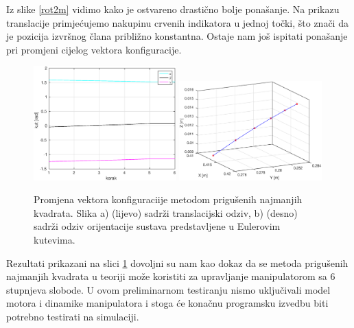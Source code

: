 \documentclass[times, utf8, diplomski, numeric]{fer}
\begin{document}
Iz slike \ref{rot2m} vidimo kako je ostvareno drastično bolje ponašanje.
Na prikazu translacije primjećujemo nakupinu crvenih indikatora u jednoj točki, što znači da je pozicija izvršnog člana približno konstantna.
Ostaje nam još ispitati ponašanje pri promjeni cijelog vektora konfiguracije.
\begin{figure}[h!]
\centering
\includegraphics[width = 0.49\textwidth]{matlab_pravocrtno2}
\includegraphics[width = 0.49\textwidth]{matlab_pravocrtno2_kut}
\caption{Promjena vektora konfiguraciije metodom prigušenih najmanjih kvadrata.
Slika a) (lijevo) sadrži translacijski odziv, b) (desno) sadrži odziv orijentacije sustava predstavljene u Eulerovim kutevima.} \label{PPI}
\end{figure}

Rezultati prikazani na slici \ref{PPI} dovoljni su nam kao dokaz da se metoda prigušenih najmanjih kvadrata u teoriji može koristiti za upravljanje manipulatorom sa 6 stupnjeva slobode.
U ovom preliminarnom testiranju nismo uključivali model motora i dinamike manipulatora i stoga će konačnu programsku izvedbu biti potrebno testirati na simulaciji.
\end{document}
